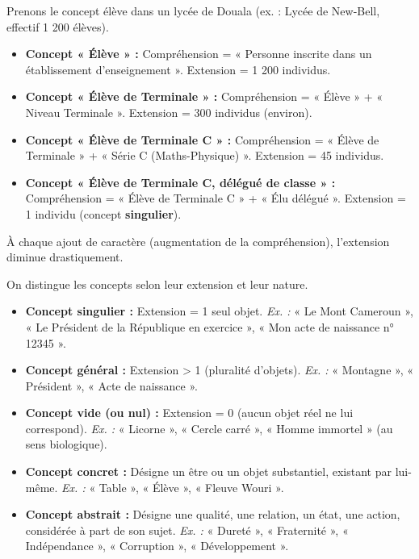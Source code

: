 \documentclass[11pt]{article}
\newcommand{\cle}[1]{{\popxbold\color{popdark}#1}}
\newcounter{popsec}
\newcounter{popsub}
\newcommand{\courssub}[1]{%
  \stepcounter{popsub}%
  \par\vspace{9pt}\noindent{\popxbold\fontsize{11.5}{13}\selectfont\color{popink}{\color{poporange}\thepopsec.\thepopsub}\hspace{6pt}#1}\par\nopagebreak\vspace{4pt}
}
\begin{document}
\begin{exemplebox}
Prenons le concept \cle{élève} dans un lycée de Douala (ex. : Lycée de New-Bell, effectif 1 200 élèves).
\begin{itemize}
    \item \textbf{Concept « Élève » :} Compréhension = « Personne inscrite dans un établissement d'enseignement ». Extension = 1 200 individus.
    \item \textbf{Concept « Élève de Terminale » :} Compréhension = « Élève » + « Niveau Terminale ». Extension = 300 individus (environ).
    \item \textbf{Concept « Élève de Terminale C » :} Compréhension = « Élève de Terminale » + « Série C (Maths-Physique) ». Extension = 45 individus.
    \item \textbf{Concept « Élève de Terminale C, délégué de classe » :} Compréhension = « Élève de Terminale C » + « Élu délégué ». Extension = 1 individu (concept \textbf{singulier}).
\end{itemize}
À chaque ajout de caractère (augmentation de la compréhension), l'extension diminue drastiquement.
\end{exemplebox}

\courssub{Classification des concepts}

On distingue les concepts selon leur extension et leur nature.

\begin{definition}
\begin{itemize}
    \item \textbf{Concept singulier :} Extension = 1 seul objet. \emph{Ex. :} « Le Mont Cameroun », « Le Président de la République en exercice », « Mon acte de naissance n° 12345 ».
    \item \textbf{Concept général :} Extension > 1 (pluralité d'objets). \emph{Ex. :} « Montagne », « Président », « Acte de naissance ».
    \item \textbf{Concept vide (ou nul) :} Extension = 0 (aucun objet réel ne lui correspond). \emph{Ex. :} « Licorne », « Cercle carré », « Homme immortel » (au sens biologique).
\end{itemize}
\end{definition}

\begin{definition}
\begin{itemize}
    \item \textbf{Concept concret :} Désigne un être ou un objet substantiel, existant par lui-même. \emph{Ex. :} « Table », « Élève », « Fleuve Wouri ».
    \item \textbf{Concept abstrait :} Désigne une qualité, une relation, un état, une action, considérée à part de son sujet. \emph{Ex. :} « Dureté », « Fraternité », « Indépendance », « Corruption », « Développement ».
\end{itemize}
\end{definition}
\end{document}
